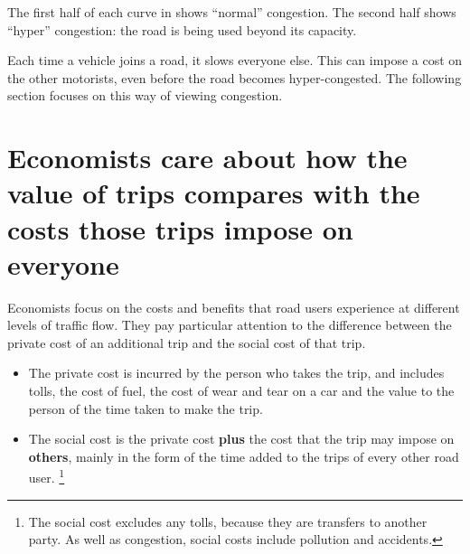 The first half of each curve in  shows “normal” congestion.
The second half shows ``hyper'' congestion: the road is being used beyond its capacity.

Each time a vehicle joins a road, it slows everyone else.
This can impose a cost on the other motorists, even before the road becomes hyper-congested.
The following section focuses on this way of viewing congestion.


\section{Economists care about how the value of trips compares with the costs those trips impose on everyone} \label{subsec:Economists-perspective}

Economists focus on the costs and benefits that road users experience at different levels of traffic flow.
They pay particular attention to the difference between the private cost of an additional trip and the social cost of that trip.

\begin{itemize}
\item The private cost is incurred by the person who takes the trip, and includes tolls, the cost of fuel, the cost of wear and tear on a car and the value to the person of the time taken to make the trip.
\item The social cost is the private cost \textbf{plus} the cost that the trip may impose on \textbf{others}, mainly in the form of the time added to the trips of every other road user.%
\footnote{The social cost excludes any tolls, because they are transfers to another party.
As well as congestion, social costs include pollution and accidents.}
\end{itemize}

